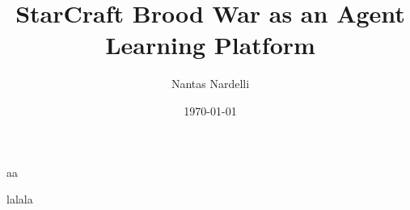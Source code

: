 \documentclass[bsc, 12pt, twoside, parskip, abbrevs, notimes, normalheadings, logo]{styles/infthesis}
\title{StarCraft Brood War as an Agent Learning Platform}
\author{Nantas Nardelli}
\date{\today}
\begin{document}
\begin{preliminary}
  \maketitle
  
  aa
  
  \standarddeclaration
  
  \dedication{}
  
  \tableofcontents

\end{preliminary}

lalala


\end{document}
